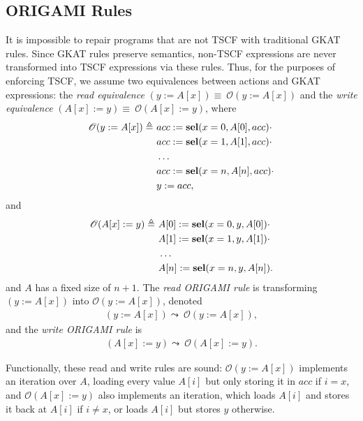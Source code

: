 \subsection{ORIGAMI Rules}
\label{sec:SideChannels:OrigamiRules}
It is impossible to repair programs that are not TSCF with traditional GKAT rules. Since GKAT rules preserve semantics, non-TSCF expressions are never transformed into TSCF expressions via these rules. 
Thus, for the purposes of enforcing TSCF, we assume two equivalences between actions and GKAT expressions: the \emph{read equivalence} $(y:=A[x])\equiv\ \mathscr{O}(y:=A[x])$ and the \emph{write equivalence} $(A[x]:=y)\equiv\ \mathscr{O}(A[x]:=y)$, where 
\begin{align*}
    \mathscr{O}(y:=A[x])\triangleq\  
    &acc:=\textbf{sel}(x=0,A[0],acc)\cdot \\
    &acc:=\textbf{sel}(x=1,A[1],acc)\cdot \\
    &\ldots\\
    &acc:=\textbf{sel}(x=n,A[n],acc)\cdot \\
    &y:=acc,
\end{align*} and 
\begin{align*}
    \mathscr{O}(A[x]:=y)\triangleq\  
    &A[0]:=\textbf{sel}(x=0,y,A[0])\cdot \\
    &A[1]:=\textbf{sel}(x=1,y,A[1])\cdot \\
    &\ldots\\
    &A[n]:=\textbf{sel}(x=n,y,A[n]).
\end{align*}
and $A$ has a fixed size of $n+1$. The \emph{read ORIGAMI rule} is transforming $(y:=A[x])$ into $\mathscr{O}(y:=A[x])$, denoted 
\begin{align}
    (y:=A[x])\leadsto\ \mathscr{O}(y:=A[x]),
\end{align}
and the \emph{write ORIGAMI rule} is 
\begin{align}
    (A[x]:=y)\leadsto\ \mathscr{O}(A[x]:=y).
\end{align}

Functionally, these read and write rules are sound: $\mathscr{O}(y:=A[x])$ implements an iteration over $A$, loading every value $A[i]$ but only storing it in $acc$ if $i=x$, and $\mathscr{O}(A[x]:=y)$ also implements an iteration, which loads $A[i]$ and stores it back at $A[i]$ if $i\neq x$, or loads $A[i]$ but stores $y$ otherwise.

